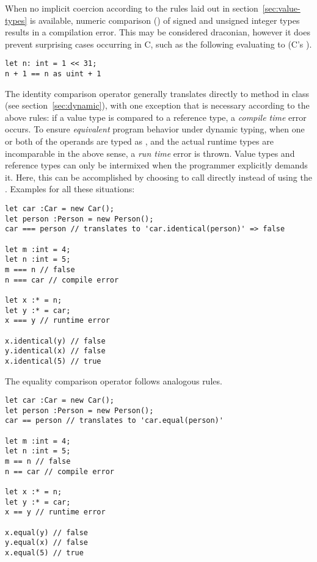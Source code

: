 When no implicit coercion according to the rules laid out in section~\ref{sec:value-types}
is available, numeric comparison (\code{==,!=,<,<=,>,>=}) of signed and unsigned
integer types results in a compilation error.
This may be considered draconian, however it does prevent surprising cases
occurring in C, such as the following evaluating to  (C's ).
\begin{verbatim}
let n: int = 1 << 31;
n + 1 == n as uint + 1
\end{verbatim}

The identity comparison operator \code{===} generally translates directly to
method  in class \code{*} (see section~\ref{sec:dynamic}), with one
exception that is necessary according to the above rules: if a value type is
compared to a reference type, a {\em compile time} error occurs. To ensure {\em
equivalent} program behavior under dynamic typing, when one or both of the
operands are typed as \code{*}, and the actual runtime types are incomparable in
the above sense, a {\em run time} error is thrown. Value types and reference
types can only be intermixed when the programmer explicitly demands it. Here,
this can be accomplished by choosing to call  directly instead of using
the . Examples for all these situations:

\begin{verbatim}
let car :Car = new Car();
let person :Person = new Person();
car === person // translates to 'car.identical(person)' => false

let m :int = 4;
let n :int = 5;
m === n // false
n === car // compile error

let x :* = n;
let y :* = car;
x === y // runtime error

x.identical(y) // false
y.identical(x) // false
x.identical(5) // true
\end{verbatim}

The equality comparison operator \code{==} follows analogous rules.
\begin{verbatim}
let car :Car = new Car();
let person :Person = new Person();
car == person // translates to 'car.equal(person)'

let m :int = 4;
let n :int = 5;
m == n // false
n == car // compile error

let x :* = n;
let y :* = car;
x == y // runtime error

x.equal(y) // false
y.equal(x) // false
x.equal(5) // true
\end{verbatim}


